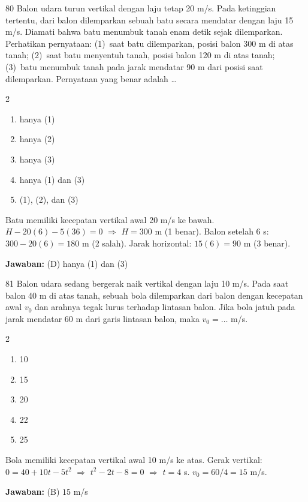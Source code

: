 \documentclass[11pt]{article}
\newenvironment{pilB}{%
  \par\smallskip\begin{multicols}{2}
  \begin{enumerate}[label=(\Alph*),leftmargin=*,itemsep=1pt,topsep=3pt]}%
  {\end{enumerate}\end{multicols}}
\newcommand{\jawaban}[1]{%
  \noindent\colorbox{gold!30}{\parbox{\dimexpr\linewidth-2\fboxsep\relax}{%
    \textbf{Jawaban:} #1}}\par\smallskip}
\begin{document}
\begin{soal}{80}
Balon udara turun vertikal dengan laju tetap 20 m/s. Pada ketinggian
tertentu, dari balon dilemparkan sebuah batu secara mendatar dengan laju
15 m/s. Diamati bahwa batu menumbuk tanah enam detik sejak dilemparkan.
Perhatikan pernyataan: (1)~saat batu dilemparkan, posisi balon 300 m di
atas tanah; (2)~saat batu menyentuh tanah, posisi balon 120 m di atas
tanah; (3)~batu menumbuk tanah pada jarak mendatar 90 m dari posisi saat
dilemparkan. Pernyataan yang benar adalah \ldots
\begin{pilB}
  \item hanya (1) \item hanya (2) \item hanya (3)
  \item hanya (1) dan (3) \item (1), (2), dan (3)
\end{pilB}
\end{soal}

\begin{pembox}
Batu memiliki kecepatan vertikal awal 20 m/s ke bawah. $H-20(6)-5(36)=0$ $\Rightarrow$ $H=300$ m (1 benar). Balon setelah 6 s: $300-20(6)=180$ m (2 salah). Jarak horizontal: $15(6)=90$ m (3 benar).
\jawaban{(D) hanya (1) dan (3)}
\end{pembox}

\begin{soal}{81}
Balon udara sedang bergerak naik vertikal dengan laju 10 m/s. Pada saat
balon 40 m di atas tanah, sebuah bola dilemparkan dari balon dengan
kecepatan awal $v_0$ dan arahnya tegak lurus terhadap lintasan balon.
Jika bola jatuh pada jarak mendatar 60 m dari garis lintasan balon,
maka $v_0=\ldots$ m/s.
\begin{pilB}
  \item 10 \item 15 \item 20 \item 22 \item 25
\end{pilB}
\end{soal}

\begin{pembox}
Bola memiliki kecepatan vertikal awal 10 m/s ke atas. Gerak vertikal: $0=40+10t-5t^2$ $\Rightarrow$ $t^2-2t-8=0$ $\Rightarrow$ $t=4$ s. $v_0=60/4=15$ m/s.
\jawaban{(B) $15$ m/s}
\end{pembox}
\end{document}
